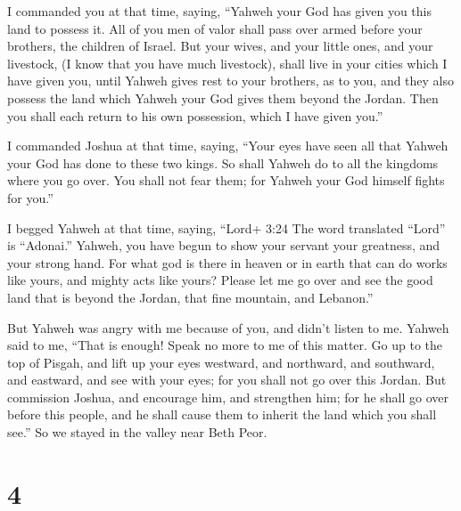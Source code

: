  I commanded you at that time, saying, ``Yahweh your God
has given you this land to possess it. All of you men of valor shall
pass over armed before your brothers, the children of Israel.
 But your wives, and your little ones, and your livestock,
(I know that you have much livestock), shall live in your cities which I
have given you,  until Yahweh gives rest to your brothers,
as to you, and they also possess the land which Yahweh your God gives
them beyond the Jordan. Then you shall each return to his own
possession, which I have given you.''

 I commanded Joshua at that time, saying, ``Your eyes have
seen all that Yahweh your God has done to these two kings. So shall
Yahweh do to all the kingdoms where you go over.  You shall
not fear them; for Yahweh your God himself fights for you.''

 I begged Yahweh at that time, saying, 
``Lord+ 3:24 The word translated ``Lord'' is ``Adonai.'' Yahweh, you
have begun to show your servant your greatness, and your strong hand.
For what god is there in heaven or in earth that can do works like
yours, and mighty acts like yours?  Please let me go over
and see the good land that is beyond the Jordan, that fine mountain, and
Lebanon.''

 But Yahweh was angry with me because of you, and didn't
listen to me. Yahweh said to me, ``That is enough! Speak no more to me
of this matter.  Go up to the top of Pisgah, and lift up
your eyes westward, and northward, and southward, and eastward, and see
with your eyes; for you shall not go over this Jordan.  But
commission Joshua, and encourage him, and strengthen him; for he shall
go over before this people, and he shall cause them to inherit the land
which you shall see.''  So we stayed in the valley near
Beth Peor.

\hypertarget{section-3}{%
\section{4}\label{section-3}}

